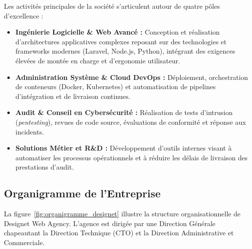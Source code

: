 \par Les activit\'es principales de la soci\'et\'e s'articulent autour de quatre p\^oles d'excellence :
\begin{itemize}
    \item \textbf{Ing\'enierie Logicielle \& Web Avanc\'e :} Conception et r\'ealisation d'architectures applicatives complexes reposant sur des technologies et frameworks modernes (Laravel, Node.js, Python), int\'egrant des exigences \'elev\'ees de mont\'ee en charge et d'ergonomie utilisateur.
    \item \textbf{Administration Syst\`eme \& Cloud DevOps :} D\'eploiement, orchestration de conteneurs (Docker, Kubernetes) et automatisation de pipelines d'int\'egration et de livraison continues.
    \item \textbf{Audit \& Conseil en Cybers\'ecurit\'e :} R\'ealisation de tests d'intrusion (\textit{pentesting}), revues de code source, \'evaluations de conformit\'e et r\'eponse aux incidents.
    \item \textbf{Solutions M\'etier et R\&D :} D\'eveloppement d'outils internes visant \`a automatiser les processus op\'erationnels et \`a r\'eduire les d\'elais de livraison des prestations d'audit.
\end{itemize}

\subsection{Organigramme de l'Entreprise}
\par La figure~\ref{fig:organigramme_designet} illustre la structure organisationnelle de Designet Web Agency. L'agence est dirig\'ee par une Direction G\'en\'erale chapeautant la Direction Technique (CTO) et la Direction Administrative et Commerciale.

